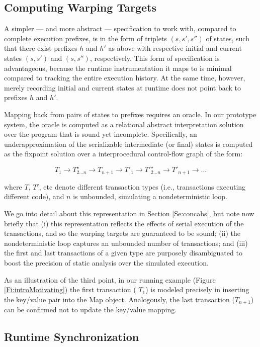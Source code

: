 \subsection{Computing Warping Targets}

A simpler --- and more abstract --- specification to work with, compared to complete execution prefixes, is in the form of triplets $(s,s',s'')$ of states, such that there exist prefixes $h$ and $h'$ as above with respective initial and current states $(s,s')$ and $(s,s'')$, respectively. This form of specification is advantageous, because the runtime instrumentation it maps to is minimal compared to tracking the entire execution history. At the same time, however, merely recording initial and current states at runtime does not point back to prefixes $h$ and $h'$.

Mapping back from pairs of states to prefixes requires an oracle. In our prototype system, the oracle is computed as a relational abstract interpretation solution over the program that is sound yet incomplete. Specifically, an underapproximation of the serializable intermediate (or final) states is computed as the fixpoint solution over a interprocedural control-flow graph of the form: 
\begin{center}
$$
	T_1 \rightarrow T^\star_{2 \ldots n} \rightarrow T_{n+1} \rightarrow T'_1 \rightarrow T'^\star_{2 \ldots n} \rightarrow T'_{n+1} \rightarrow \ldots
$$
\end{center}
where $T$, $T'$, etc denote different transaction types (i.e., transactions executing different code), and $n$ is unbounded, simulating a nondeterministic loop. 

We go into detail about this representation in Section \ref{Se:concabs}, but note now briefly that (i) this representation reflects the effects of serial execution of the transactions, and so the warping targets are guaranteed to be sound; (ii) the nondeterministic loop captures an unbounded number of transactions; and (iii) the first and last transactions of a given type are purposely disambiguated to boost the precision of static analysis over the simulated execution.

As an illustration of the third point, in our running example (Figure \ref{Fi:introMotivating}) the first transaction ( $T_1$) is modeled precisely in inserting the key/value pair into the {\sf Map} object. Analogously, the last transaction ($T_{n+1}$) can be confirmed not to update the key/value mapping.

\subsection{Runtime Synchronization} 

